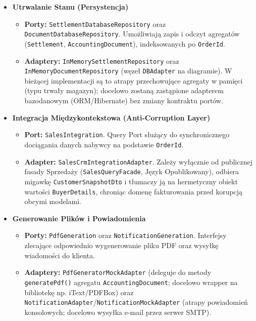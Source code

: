 \begin{itemize}
    \item \textbf{Utrwalanie Stanu (Persystencja)}
    \begin{itemize}
        \item \textbf{Porty:} \texttt{SettlementDatabaseRepository} oraz \texttt{DocumentDatabaseRepository}. Umożliwiają zapis i odczyt agregatów (\texttt{Settlement}, \texttt{AccountingDocument}), indeksowanych po \texttt{OrderId}.
        \item \textbf{Adaptery:} \texttt{InMemorySettlementRepository} oraz \texttt{InMemoryDocumentRepository} (węzeł \texttt{DBAdapter} na diagramie). W bieżącej implementacji są to atrapy przechowujące agregaty w pamięci (typu trwały magazyn); docelowo zostaną zastąpione adapterem bazodanowym (ORM/Hibernate) bez zmiany kontraktu portów.
    \end{itemize}

    \item \textbf{Integracja Międzykontekstowa (Anti-Corruption Layer)}
    \begin{itemize}
        \item \textbf{Port:} \texttt{SalesIntegration}. Query Port służący do synchronicznego dociągania danych nabywcy na podstawie \texttt{OrderId}.
        \item \textbf{Adapter:} \texttt{SalesCrmIntegrationAdapter}. Zależy wyłącznie od publicznej fasady Sprzedaży (\texttt{SalesQueryFacade}, Język Opublikowany), odbiera migawkę \texttt{CustomerSnapshotDto} i tłumaczy ją na hermetyczny obiekt wartości \texttt{BuyerDetails}, chroniąc domenę fakturowania przed korupcją obcymi modelami.
    \end{itemize}

    \item \textbf{Generowanie Plików i Powiadomienia}
    \begin{itemize}
        \item \textbf{Porty:} \texttt{PdfGeneration} oraz \texttt{NotificationGeneration}. Interfejsy zlecające odpowiednio wygenerowanie pliku PDF oraz wysyłkę wiadomości do klienta.
        \item \textbf{Adaptery:} \texttt{PdfGeneratorMockAdapter} (deleguje do metody \texttt{generatePdf()} agregatu \texttt{AccountingDocument}; docelowo wrapper na bibliotekę np. iText/PDFBox) oraz \texttt{NotificationAdapter}/\texttt{NotificationMockAdapter} (atrapy powiadomień konsolowych; docelowo wysyłka e-mail przez serwer SMTP).
    \end{itemize}


\end{itemize}
